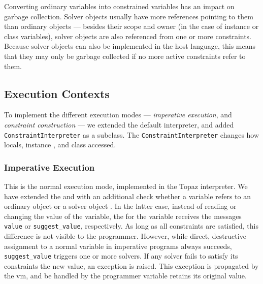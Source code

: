 Converting ordinary variables into constrained variables has an impact
on garbage collection.  Solver objects usually have more references
pointing to them than ordinary objects --- besides their scope and
owner (in the case of instance or class variables), solver objects are
also referenced from one or more constraints. Because solver objects
can also be implemented in the host language, this means that they may
only be garbage collected if no more active constraints refer to them.

\subsection{Execution Contexts}
\label{sec:constraint-construction-impl}

To implement the different execution modes --- \emph{imperative
  execution}, and \emph{constraint construction} --- we extended the
default interpreter, and added \lstinline{ConstraintInterpreter} as a
subclass. The \DIFdelbegin {}\DIFdelend \DIFaddbegin \lstinline{ConstraintInterpreter} \DIFaddend changes how locals,
instance \DIFdelbegin {}\DIFdelend \DIFaddbegin {}\DIFaddend , and class \DIFdelbegin {}\DIFdelend \DIFaddbegin {}\DIFaddend accessed.

\subsubsection{Imperative Execution}
This is the normal execution mode, \DIFaddbegin {}\DIFaddend implemented in the Topaz
interpreter. We have extended the \store and \load \DIFdelbegin {}\DIFdelend \DIFaddbegin {}\DIFaddend with an
additional check whether a variable refers \DIFaddbegin {}\DIFaddend to an ordinary object
or \DIFaddbegin {}\DIFaddend a solver object \DIFaddbegin {}\DIFaddend . In the latter case, instead of reading or changing the
value of the variable, the \DIFdelbegin \emph{} %
\DIFdelend \DIFaddbegin {}\DIFaddend for the variable
receives the messages \lstinline{value} or \lstinline{suggest_value},
respectively. As long as all constraints are satisfied, this
difference is not visible to the programmer. However, while direct,
destructive assignment to a normal variable in imperative programs
always succeeds, \lstinline{suggest_value} triggers one or more
solvers. If any solver fails to satisfy its constraints \DIFdelbegin {}\DIFdelend \DIFaddbegin {}\DIFaddend the new
value, an exception is raised. This exception is propagated by the
\ac{vm}, and \DIFdelbegin {}\DIFdelend \DIFaddbegin {}\DIFaddend be handled by the programmer \DIFdelbegin {}\DIFdelend \DIFaddbegin {}\DIFaddend variable retains its original value.


